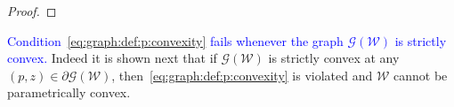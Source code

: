 \documentclass[smallextended]{svjour3}       %
\numberwithin{equation}{section}
\newcommand{\revision}[1]{\textcolor{blue}{#1}}
\begin{document}
\begin{proof}
\end{proof}
%

\revision{%
Condition~\eqref{eq:graph:def:p:convexity} fails whenever the graph $\mathscr G(\mathcal W)$ is strictly convex.}
%
Indeed it is shown next that if $\mathscr G(\mathcal W)$ is strictly convex at any $(p,z)\in\partial \mathscr G (\mathcal W)$, then~\eqref{eq:graph:def:p:convexity} is violated and 
$\mathcal W$ cannot be parametrically convex.
\end{document}
